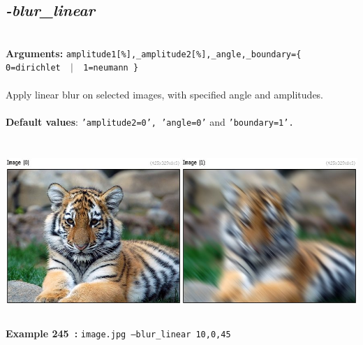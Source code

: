 \documentclass[a4paper,11pt,twoside]{book}
\begin{document}
\subsection{\emph{-blur\_linear} }\vspace*{-0.5em}
~\\\textbf{Arguments: } 
{\small \texttt{amplitude1[\%],\_amplitude2[\%],\_angle,\_boundary=\{ 0=dirichlet ~$|$~ 1=neumann \}}}\\~\\
Apply linear blur on selected images, with specified angle and amplitudes.
~\\~\\\textbf{Default values}: {\small \texttt{'amplitude2=0', 'angle=0'} and \texttt{'boundary=1'.}}
\begin{center}\includegraphics[keepaspectratio=true,height=7cm,width=\textwidth]{img/gmic_def245.jpg}\\
{\footnotesize \textbf{Example 245~:} \texttt{image.jpg --blur\_linear 10,0,45}}
\end{center}
\end{document}
